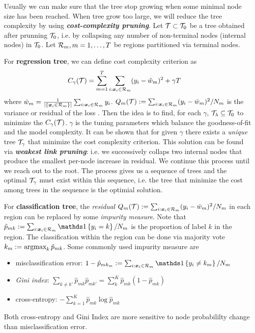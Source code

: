 \documentclass[11pt]{article}
\begin{document}
Usually we can make sure that the tree stop growing when some minimal node size has been reached. When tree grow too large,  we will reduce the tree complexity by using \emph{\textbf{cost-complexity pruning}}. Let ${\mathcal T} \subset {\mathcal T}_{0}$ be a tree obtained after prunning ${\mathcal T}_{0}$, i.e. by collapsing any number of non-terminal nodes (internal nodes) in ${\mathcal T}_{0}$. Let ${\mathcal R}_{m}, m=1,\dots,T$ be regions partitioned via terminal nodes. 

For \textbf{regression tree}, we can define cost complexity criterion as 
\begin{align*}
C_{\gamma}({\mathcal T}) &= \sum_{m=1}^{T}\sum_{i: \boldsymbol{x}_{i} \in {\mathcal R}_{m}}(y_i - \hat{w}_{m})^{2} + \gamma T
\end{align*} where $\hat{w}_{m} = \frac{1}{|\left\{\boldsymbol{x}_{i} \in {\mathcal R}_{m}\right\}|} \sum_{i: \boldsymbol{x}_{i} \in {\mathcal R}_{m}} y_{i}$. $Q_{m}({\mathcal T}) := \sum_{i: \boldsymbol{x}_{i} \in {\mathcal R}_{m}}(y_i - \hat{w}_{m})^{2} / N_{m}$ is the variance or residual of the loss \citep{hastie2009elements}.  Then the idea is to find, for each $\gamma$, ${\mathcal T}_{\lambda} \subseteq {\mathcal T}_{0}$ to minimize the $C_{\gamma}({\mathcal T})$. $\gamma$ is the tuning parameters which balance the goodness-of-fit and the model complexity. It can be shown that for given $\gamma$ there exists a \emph{unique} tree ${\mathcal T}_{\gamma}$ that minimize the cost complexity criterion. This solution can be found via \emph{\textbf{weakest link pruning}}: i.e. we successively collaps two internal nodes that produce the smallest per-node increase in residual. We continue this process until we reach out to the root. The process gives us a sequence of trees and the optimal ${\mathcal T}_{\gamma}$ must exist within this sequence, i.e. the tree that minimize the cost among trees in the sequence is the optimial solution. 

For \textbf{classification tree}, the \emph{residual} $Q_{m}({\mathcal T}) := \sum_{i: \boldsymbol{x}_{i} \in {\mathcal R}_{m}}(y_i - \hat{w}_{m})^{2} / N_{m}$ in each region can be replaced by some \emph{impurity measure}. Note that $\hat{p}_{mk} := \sum_{i: \mb{x}_{i} \in \cR_{m}}\ind{y_{i} = k}/ N_{m}$ is the proportion of label $k$ in the region. The classification within the region can be done via majority vote $k_m := \operatorname{argmax}_{k} \hat{p}_{mk}$.  Some commonly used impurity measure are
\begin{itemize}
\item misclassification error: $1-\hat{p}_{mk_{m}} := \sum_{i: \mb{x}_{i} \in \cR_{m}}\ind{y_{i} \neq k_{m}}/ N_{m}$
\item \emph{Gini index}: $\sum_{k \neq k'}\hat{p}_{mk}\hat{p}_{mk'} = \sum_{k}^{K}\hat{p}_{mk}(1-\hat{p}_{mk})$ 
\item cross-entropy: $-\sum_{k=1}^{K}\hat{p}_{mk}\log \hat{p}_{mk}$ 
\end{itemize}
Both cross-entropy and Gini Index are more sensitive to node probabililty change than misclassification error. 
\end{document}
